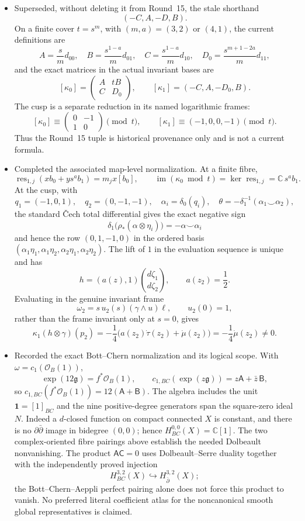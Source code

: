 \begin{itemize}[leftmargin=1.8em]
\item Superseded, without deleting it from Round~15, the stale shorthand
\[
 (-C,A,-D,B).
\]
On a finite cover \(t=s^m\), with \((m,a)=(3,2)\) or \((4,1)\), the current
definitions are
\[
 A=\frac{s}{m}d_{00},\quad B=\frac{s^{1-a}}m d_{01},\quad
 C=\frac{s^{1-a}}m d_{10},\quad
 D_0=\frac{s^{m+1-2a}}m d_{11},
\]
and the exact matrices in the actual invariant bases are
\[
 [\kappa_0]=\begin{pmatrix}A&tB\\C&D_0\end{pmatrix},\qquad
 [\kappa_1]=(-C,A,-D_0,B).
\]
The cusp is a separate reduction in its named logarithmic frames:
\[
 [\kappa_0]\equiv\begin{pmatrix}0&-1\\1&0\end{pmatrix}\pmod t,\qquad
 [\kappa_1]\equiv(-1,0,0,-1)\pmod t.
\]
Thus the Round~15 tuple is historical provenance only and is not a current
formula.

\item Completed the associated map-level normalization.  At a finite fibre,
\[
 \operatorname{res}_{1,j}(xb_0+ys^ab_1)=m_jx[b_0],\qquad
 \operatorname{im}(\kappa_0\bmod t)
 =\ker\operatorname{res}_{1,j}=\mathbb C\,s^ab_1.
\]
At the cusp, with
\[
 q_1=(-1,0,1),\quad q_2=(0,-1,-1),\quad
 \alpha_i=\delta_0(q_i),\quad
 \theta=-\delta_1^{-1}(\alpha_1\smile\alpha_2),
\]
the standard \v Cech total differential gives the exact negative sign
\[
 \delta_1\bigl(\rho_*(\alpha\otimes\eta_i)\bigr)
 =-\alpha\smile\alpha_i
\]
and hence the row \((0,1,-1,0)\) in the ordered basis
\((\alpha_1\eta_1,\alpha_1\eta_2,\alpha_2\eta_1,\alpha_2\eta_2)\).
The lift of \(1\) in the evaluation sequence is unique and has
\[
 h=(a(z),1)\binom{d\zeta_1}{d\zeta_2},\qquad a(z_2)=\frac12.
\]
Evaluating in the genuine invariant frame
\[
 \omega_2=s\,u_2(s)(\gamma\wedge u)\ell,\qquad u_2(0)=1,
\]
rather than the frame invariant only at \(s=0\), gives
\[
 \kappa_1(h\otimes\gamma)(p_2)
 =-\frac14\bigl(a(z_2)\dot\tau(z_2)+\dot\mu(z_2)\bigr)
 =-\frac14\dot\mu(z_2)\ne0.
\]

\item Recorded the exact Bott--Chern normalization and its logical scope.
With \(\omega=c_1(\mathcal O_B(1))\),
\[
 \exp(12\mathfrak g)=f^*\mathcal O_B(1),\qquad
 c_{1,BC}(\exp(z\mathfrak g))=z\mathsf A+\bar z\,\mathsf B,
\]
so \(c_{1,BC}(f^*\mathcal O_B(1))=12(\mathsf A+\mathsf B)\).
The algebra includes the unit \(\mathbf1=[1]_{BC}\) and the nine
positive-degree generators span the square-zero ideal \(N\).  Indeed a
\(d\)-closed function on compact connected \(X\) is constant, and there is no
\(\partial\bar\partial\) image in bidegree \((0,0)\); hence
\(H^{0,0}_{BC}(X)=\mathbb C[1]\).  The two
complex-oriented fibre pairings above establish the needed Dolbeault
nonvanishing.  The product \(\mathsf A\mathsf C=0\) uses
Dolbeault--Serre duality together with the independently proved injection
\[
 H^{3,2}_{BC}(X)\hookrightarrow H^{3,2}_{\bar\partial}(X);
\]
the Bott--Chern--Aeppli perfect pairing alone does not force this product to
vanish.  No preferred literal coefficient atlas for the noncanonical smooth
global representatives is claimed.


\end{itemize}

